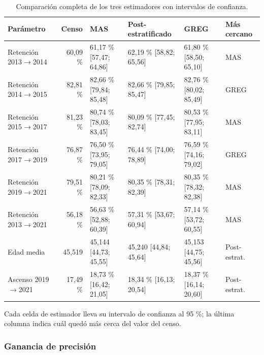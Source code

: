 \begin{table}[H]
  \centering
  \scriptsize
  \caption{Comparación completa de los tres estimadores con intervalos de confianza.}
  \label{tab:mues-comparativa}
  \begin{tabular}{@{}lrlp{3.5cm}p{3.5cm}l@{}}
    \toprule
    \textbf{Parámetro} & \textbf{Censo} & \textbf{MAS} & \textbf{Post-estratificado}
      & \textbf{GREG} & \textbf{Más cercano} \\
    \midrule
    Retención 2013$\rightarrow$2014 & 60,09 \% & 61,17 \% [57,47; 64,86]
      & 62,19 \% [58,82; 65,56] & 61,80 \% [58,50; 65,10] & MAS \\
    Retención 2014$\rightarrow$2015 & 82,81 \% & 82,66 \% [79,84; 85,48]
      & 82,66 \% [79,85; 85,47] & 82,76 \% [80,02; 85,49] & GREG \\
    Retención 2015$\rightarrow$2017 & 81,23 \% & 80,74 \% [78,03; 83,45]
      & 80,09 \% [77,45; 82,74] & 80,53 \% [77,95; 83,11] & MAS \\
    Retención 2017$\rightarrow$2019 & 76,87 \% & 76,50 \% [73,95; 79,05]
      & 76,44 \% [74,00; 78,89] & 76,59 \% [74,16; 79,02] & GREG \\
    Retención 2019$\rightarrow$2021 & 79,51 \% & 80,21 \% [78,09; 82,33]
      & 80,35 \% [78,31; 82,39] & 80,35 \% [78,32; 82,38] & MAS \\
    Retención 2013$\rightarrow$2021 & 56,18 \% & 56,63 \% [52,88; 60,39]
      & 57,31 \% [53,67; 60,94] & 57,14 \% [53,72; 60,55] & MAS \\
    Edad media & 45,519 & 45,144 [44,73; 45,55] & 45,240 [44,84; 45,64]
      & 45,153 [44,75; 45,56] & Post-estrat. \\
    Ascenso 2019$\rightarrow$2021 & 17,49 \% & 18,73 \% [16,42; 21,05]
      & 18,34 \% [16,13; 20,54] & 18,37 \% [16,14; 20,60] & Post-estrat. \\
    \bottomrule
  \end{tabular}

  \smallskip
  {\footnotesize Cada celda de estimador lleva su intervalo de confianza al
  95 \%; la última columna indica cuál quedó más cerca del valor del censo.}
\end{table}

\subsubsection{Ganancia de precisión}

